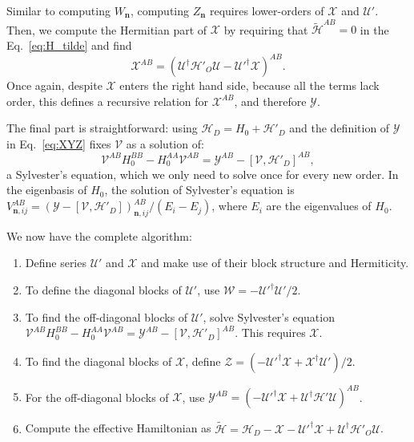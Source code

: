%
Similar to computing $W_{\mathbf{n}}$, computing $Z_{\mathbf{n}}$ requires lower-orders of $\mathcal{X}$ and $\mathcal{U}'$.
Then, we compute the Hermitian part of $\mathcal{X}$ by requiring that $\tilde{\mathcal{H}}^{AB} = 0$ in the Eq.~\eqref{eq:H_tilde} and find
%
\begin{equation}
\label{eq:Y}
\mathcal{X}^{AB} = (\mathcal{U}^\dagger \mathcal{H}'_{O} \mathcal{U} -
\mathcal{U}'^\dagger \mathcal{X})^{AB}.
\end{equation}
%
Once again, despite $\mathcal{X}$ enters the right hand side, because all the terms lack  order, this defines a recursive relation for $\mathcal{X}^{AB}$, and therefore $\mathcal{Y}$.

The final part is straightforward: using $\mathcal{H}_{D} = H_0 + \mathcal{H}'_{D}$ and the definition of $\mathcal{Y}$ in Eq.~\eqref{eq:XYZ} fixes $\mathcal{V}$ as a solution of:
%
\begin{equation}
\label{eq:sylvester}
\mathcal{V}^{AB}H_0^{BB} - H_0^{AA} \mathcal{V}^{AB} = \mathcal{Y}^{AB} - [\mathcal{V}, \mathcal{H}'_{D}]^{AB},
\end{equation}
%
a Sylvester's equation, which we only need to solve once for every new order.
In the eigenbasis of $H_0$, the solution of Sylvester's equation is $V^{AB}_{\mathbf{n}, ij} = (\mathcal{Y} - [\mathcal{V}, \mathcal{H}'_{D}])^{AB}_{\mathbf{n}, ij}/(E_i - E_j)$, where $E_i$ are the eigenvalues of $H_0$.

We now have the complete algorithm:
%
\begin{enumerate}
    \item Define series $\mathcal{U}'$ and $\mathcal{X}$ and make use of their block structure and Hermiticity.
    \item To define the diagonal blocks of $\mathcal{U}'$, use $\mathcal{W} = -\mathcal{U}'^\dagger\mathcal{U}'/2$.
    \item To find the off-diagonal blocks of $\mathcal{U}'$, solve Sylvester's equation \\ $\mathcal{V}^{AB}H_0^{BB} - H_0^{AA}\mathcal{V}^{AB} = \mathcal{Y}^{AB} - [\mathcal{V}, \mathcal{H}'_{D}]^{AB}$.
      This requires $\mathcal{X}$.
    \item To find the diagonal blocks of $\mathcal{X}$, define $\mathcal{Z} = (-\mathcal{U}'^\dagger\mathcal{X} + \mathcal{X}^\dagger\mathcal{U}')/2$.
    \item For the off-diagonal blocks of $\mathcal{X}$, use $\mathcal{Y}^{AB} =
    (-\mathcal{U}'^\dagger\mathcal{X} + \mathcal{U}^\dagger\mathcal{H}'\mathcal{U})^{AB}$.
    \item  Compute the effective Hamiltonian as $\tilde{\mathcal{H}} = \mathcal{H}_{D} - \mathcal{X} - \mathcal{U}'^\dagger \mathcal{X} + \mathcal{U}^\dagger\mathcal{H}'_{O}\mathcal{U}$.
\end{enumerate}

